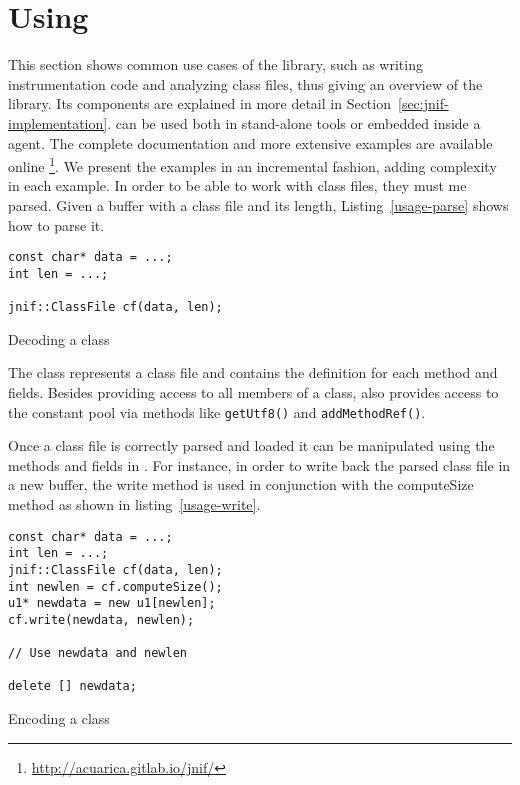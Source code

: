 \section{Using \jnif{}}\label{sec:jnif-usage}

This section shows common use cases of the \jnif{} library, 
such as writing instrumentation code and analyzing class files, 
thus giving an overview of the library. 
Its components are explained in more detail in Section~\ref{sec:jnif-implementation}.
\jnif{} can be used both in stand-alone tools or
embedded inside a \jvmti{} agent.
The complete \api{} documentation and more extensive examples are available online%
\footnote{\url{http://acuarica.gitlab.io/jnif/}}.
We present the examples in an incremental fashion,
adding complexity in each example.
In order to be able to work with class files, they must me parsed. 
Given a buffer with a class file and its length,
Listing~\ref{usage-parse} shows how to parse it.

\begin{listing}
\begin{verbatim}
const char* data = ...;
int len = ...;

jnif::ClassFile cf(data, len);
\end{verbatim}
\caption{Decoding a class}
\label{usage-parse}
\end{listing}

The class  represents a \java{} class file and contains the definition for each method and fields. 
Besides providing access to all members of a class,
 also provides access to the constant pool
via methods like \texttt{getUtf8()} and \texttt{addMethodRef()}.

Once a class file is correctly parsed and loaded it can be manipulated using the methods and fields in .
For instance, in order to write back the parsed class file in a new buffer, the write method is used in conjunction with the computeSize method as shown in listing~\ref{usage-write}.

\begin{listing}
\begin{verbatim}
const char* data = ...;
int len = ...;
jnif::ClassFile cf(data, len);
int newlen = cf.computeSize();
u1* newdata = new u1[newlen];
cf.write(newdata, newlen);

// Use newdata and newlen

delete [] newdata;
\end{verbatim}
\caption{Encoding a class}
\label{usage-write}
\end{listing}

